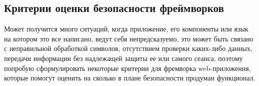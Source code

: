 
\subsection{Критерии оценки безопасности фреймворков}
Может получится много ситуаций, когда приложение, его компоненты или язык на котором это все написано,
ведут себя непредсказуемо, это может быть связано с неправильной обработкой символов, отсутствием проверки каких-либо данных, 
передачи информации без надлежащей защиты ее или самого сеанса, поэтому попробую сформулировать некоторые критерии для фремворка web-приложения,
которые помогут оценить на сколько в плане безопасности продуман функционал.















